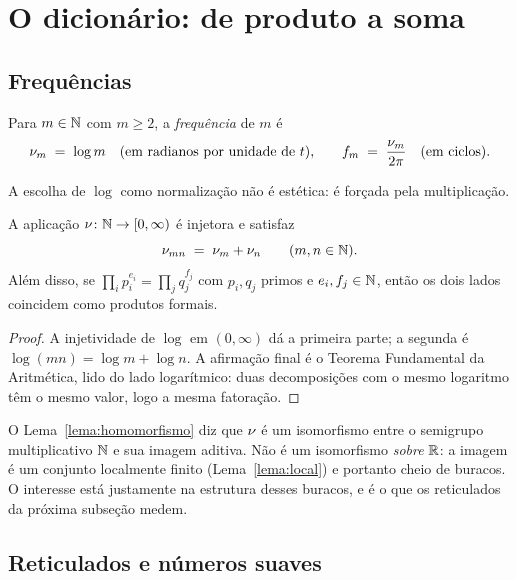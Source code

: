 \section{O dicionário: de produto a soma}\label{sec:dicionario}

\subsection{Frequências}

\begin{definicao}\label{def:freq}
Para $m\in\mathbb{N}$ com $m\ge 2$, a \emph{frequência} de $m$ é
\[
  \nu_{m} \;=\; \log m \quad\text{(em radianos por unidade de $t$),}
  \qquad
  f_{m} \;=\; \frac{\nu_{m}}{2\pi} \quad\text{(em ciclos).}
\]
\end{definicao}

A escolha de $\log$ como normalização não é estética: é forçada pela
multiplicação.

\begin{lema}\label{lema:homomorfismo}
A aplicação $\nu_{}\colon \mathbb{N}\to[0,\infty)$ é injetora e satisfaz
\[
  \nu_{mn} \;=\; \nu_{m} + \nu_{n} \qquad (m,n\in\mathbb{N}).
\]
Além disso, se $\prod_{i} p_i^{e_i} = \prod_{j} q_j^{f_j}$ com $p_i,q_j$ primos e
$e_i,f_j\in\mathbb{N}$, então os dois lados coincidem como produtos formais.
\end{lema}

\begin{proof}
A injetividade de $\log$ em $(0,\infty)$ dá a primeira parte; a segunda é
$\log(mn)=\log m+\log n$. A afirmação final é o Teorema Fundamental da
Aritmética, lido do lado logarítmico: duas decomposições com o mesmo logaritmo
têm o mesmo valor, logo a mesma fatoração.
\end{proof}

O Lema~\ref{lema:homomorfismo} diz que $\nu_{}$ é um isomorfismo entre o
semigrupo multiplicativo $\mathbb{N}$ e sua imagem aditiva. Não é um isomorfismo
\emph{sobre} $\mathbb{R}$: a imagem é um conjunto localmente finito (Lema~\ref{lema:local})
e portanto cheio de buracos. O interesse está justamente na estrutura desses
buracos, e é o que os reticulados da próxima subseção medem.

\subsection{Reticulados e números suaves}


